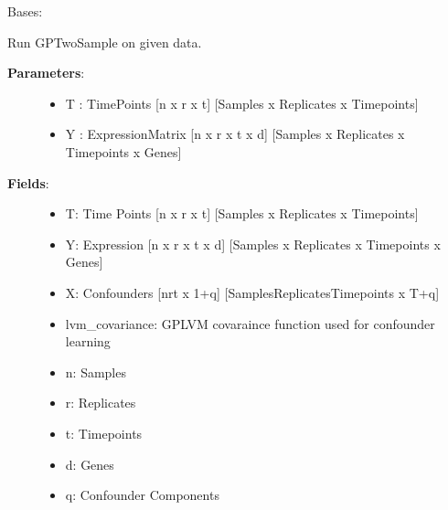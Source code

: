 \documentclass[letterpaper,10pt]{sphinxmanual}
\begin{document}
\begin{fulllineitems}
\label{base:gptwosample.twosample.twosample.TwoSample}
Bases: 

Run GPTwoSample on given data.
\begin{description}
\item[{\textbf{Parameters}:}] \leavevmode\begin{itemize}
\item {} 
T : TimePoints {[}n x r x t{]}    {[}Samples x Replicates x Timepoints{]}

\item {} 
Y : ExpressionMatrix {[}n x r x t x d{]}      {[}Samples x Replicates x Timepoints x Genes{]}

\end{itemize}

\item[{\textbf{Fields}:}] \leavevmode\begin{itemize}
\item {} 
T: Time Points {[}n x r x t{]} {[}Samples x Replicates x Timepoints{]}

\item {} 
Y: Expression {[}n x r x t x d{]} {[}Samples x Replicates x Timepoints x Genes{]}

\item {} 
X: Confounders {[}nrt x 1+q{]} {[}SamplesReplicatesTimepoints x T+q{]}

\item {} 
lvm\_covariance: GPLVM covaraince function used for confounder learning

\item {} 
n: Samples

\item {} 
r: Replicates

\item {} 
t: Timepoints

\item {} 
d: Genes

\item {} 
q: Confounder Components

\end{itemize}

\end{description}


\end{fulllineitems}
\end{document}
